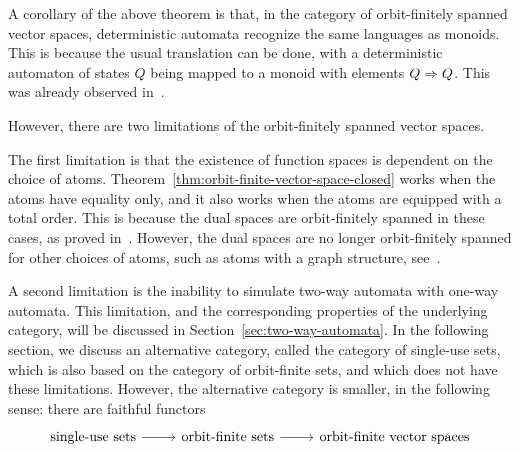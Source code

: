 A corollary of the above theorem is that, in the category of orbit-finitely spanned vector spaces, deterministic automata recognize the same languages as monoids. This is because the usual translation can be done, with a deterministic automaton of states $Q$ being mapped to a monoid with elements $Q \Rightarrow Q$. This was already observed in~\cite[Theorem VIII.3]{bojanczykKM21OrbitFiniteVector}.

However, there are two limitations of the orbit-finitely spanned vector spaces. 

The first limitation is that the existence of function spaces is dependent on the choice of atoms. Theorem~\ref{thm:orbit-finite-vector-space-closed}  works when the atoms have equality only, and it also works when the atoms are equipped with a total order. This is because the dual spaces are orbit-finitely spanned in these cases, as proved in~\cite[Corollary VI.5]{bojanczykKM21OrbitFiniteVector}. However, the dual spaces are no longer orbit-finitely spanned for other choices of  atoms, such as atoms with a graph structure, see~\cite[Example 9]{bojanczykKM21OrbitFiniteVector}.

A second limitation is the inability to simulate two-way automata with one-way automata. This limitation, and the corresponding properties of the underlying category, will be discussed in Section~\ref{sec:two-way-automata}. In the following section, we discuss an alternative category, called the category of single-use sets, which is also based on the category of orbit-finite sets, and which does not have these limitations. However, the alternative category is smaller, in the following sense: there are faithful functors 
\[
\begin{tikzcd}
\text{single-use sets} \ar[r, ] & 
\text{orbit-finite sets} \ar[r] &
\text{orbit-finite vector spaces}
\end{tikzcd}
\]